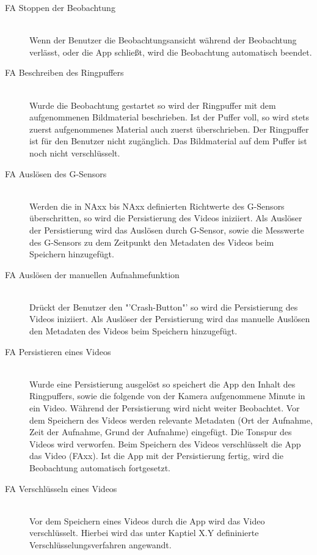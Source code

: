 \begin{description}
\item[FA Stoppen der Beobachtung] \hfill \\
Wenn der Benutzer die Beobachtungsansicht während der Beobachtung verlässt, oder die App schließt, wird die Beobachtung automatisch beendet.

\item[FA Beschreiben des Ringpuffers] \hfill \\
Wurde die Beobachtung gestartet so wird der Ringpuffer mit dem aufgenommenen Bildmaterial beschrieben. Ist der Puffer voll, so wird stets zuerst aufgenommenes Material auch zuerst überschrieben. Der Ringpuffer ist für den Benutzer nicht zugänglich. Das Bildmaterial auf dem Puffer ist noch nicht verschlüsselt.

\item[FA Auslösen des G-Sensors] \hfill \\
Werden die in NAxx bis NAxx definierten Richtwerte des G-Sensors überschritten, so wird die Persistierung des Videos iniziiert. Als Auslöser der Persistierung wird das Auslösen durch G-Sensor, sowie die Messwerte des G-Sensors zu dem Zeitpunkt den Metadaten des Videos beim Speichern hinzugefügt.

\item[FA Auslösen der manuellen Aufnahmefunktion] \hfill \\
Drückt der Benutzer den "'Crash-Button"' so wird die Persistierung des Videos iniziiert. Als Auslöser der Persistierung wird das manuelle Auslösen den Metadaten des Videos beim Speichern hinzugefügt.

\item[FA Persistieren eines Videos] \hfill \\
Wurde eine Persistierung ausgelöst so speichert die App den Inhalt des Ringpuffers, sowie die folgende von der Kamera aufgenommene Minute in ein Video. Während der Persistierung wird nicht weiter Beobachtet. Vor dem Speichern des Videos werden relevante Metadaten (Ort der Aufnahme, Zeit der Aufnahme, Grund der Aufnahme) eingefügt. Die Tonspur des Videos wird verworfen. Beim Speichern des Videos verschlüsselt die App das Video (FAxx). Ist die App mit der Persistierung fertig, wird die Beobachtung automatisch fortgesetzt.

\item[FA Verschlüsseln eines Videos] \hfill \\
Vor dem Speichern eines Videos durch die App wird das Video verschlüsselt. Hierbei wird das unter Kaptiel X.Y defininierte Verschlüsselungsverfahren angewandt.


\end{description}
